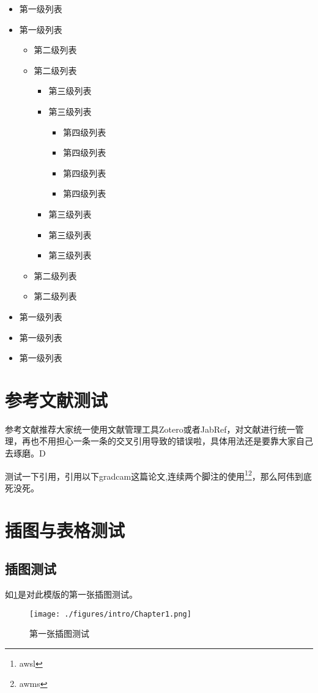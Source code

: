 \begin{itemize}
	\item 第一级列表
	\item 第一级列表
	\begin{itemize}
		\item 第二级列表
		\item 第二级列表
		\begin{itemize}
			\item 第三级列表
			\item 第三级列表
			\begin{itemize}
				\item 第四级列表
				\item 第四级列表
				\item 第四级列表
				\item 第四级列表
			\end{itemize}
			\item 第三级列表
			\item 第三级列表
			\item 第三级列表
		\end{itemize}
		\item 第二级列表
		\item 第二级列表
	\end{itemize}
	\item 第一级列表
	\item 第一级列表
	\item 第一级列表
\end{itemize}

\section{参考文献测试}
参考文献推荐大家统一使用文献管理工具Zotero或者JabRef，对文献进行统一管理，再也不用担心一条一条的交叉引用导致的错误啦，具体用法还是要靠大家自己去琢磨。D

测试一下引用\cite{selvaraju_grad-cam:_2016}，引用以下gradcam这篇论文,连续两个脚注的使用{\footnote{awsl}}{\footnote{awms}}，那么阿伟到底死没死。

\section{插图与表格测试}
\subsection{插图测试}
如\ref{fig:first_image_tset}是对此模版的第一张插图测试。

\begin{figure}[htbp] %
	\centering %
	\texttt{[image: ./figures/intro/Chapter1.png]}
	\caption{第一张插图测试\cite{selvaraju_grad-cam:_2016}} %
	\label{fig:first_image_tset}
\end{figure}

